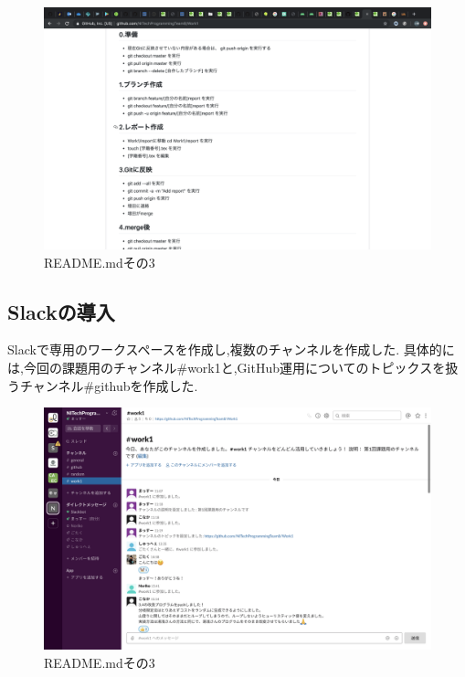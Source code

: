 \documentclass[uplatex,12pt]{jsarticle}
\begin{document}
\newpage

\begin{figure}[!hbt]
  \centering
  \includegraphics[scale=0.20]{git_image/read_me_3.png}
  \caption{README.mdその3}
\end{figure}

\subsection{Slackの導入}
Slackで専用のワークスペースを作成し,複数のチャンネルを作成した.
具体的には,今回の課題用のチャンネル\#work1と,GitHub運用についてのトピックスを扱うチャンネル\#githubを作成した.

\begin{figure}[!hbt]
  \centering
  \includegraphics[scale=0.20]{git_image/slack_image.png}
  \caption{README.mdその3}
\end{figure}
\end{document}
